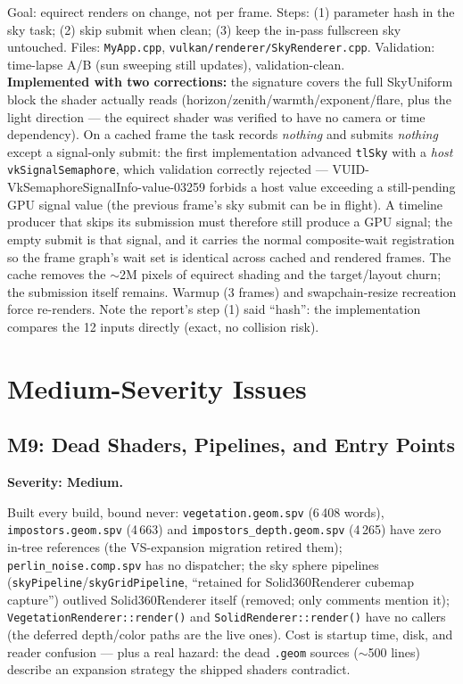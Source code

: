 \documentclass[11pt,a4paper]{article}
\begin{document}
\begin{tcolorbox}[promptbox={Prompt --- H8: cache the sky equirect}]
Goal: equirect renders on change, not per frame. Steps: (1) parameter hash
in the sky task; (2) skip submit when clean; (3) keep the in-pass
fullscreen sky untouched. Files: \texttt{MyApp.cpp},
\texttt{vulkan/renderer/SkyRenderer.cpp}. Validation: time-lapse A/B
(sun sweeping still updates), validation-clean.
\\ \textbf{Implemented with two corrections:} the signature covers the
full SkyUniform block the shader actually reads
(horizon/zenith/warmth/exponent/flare, plus the light direction --- the
equirect shader was verified to have no camera or time dependency). On a
cached frame the task records \emph{nothing} and submits \emph{nothing}
except a signal-only submit: the first implementation advanced
\texttt{tlSky} with a \emph{host} \texttt{vkSignalSemaphore}, which
validation correctly rejected --- VUID-VkSemaphoreSignalInfo-value-03259
forbids a host value exceeding a still-pending GPU signal value (the
previous frame's sky submit can be in flight). A timeline producer that
skips its submission must therefore still produce a GPU signal; the empty
submit is that signal, and it carries the normal composite-wait
registration so the frame graph's wait set is identical across cached and
rendered frames. The cache removes the $\sim$2M pixels of equirect shading
and the target/layout churn; the submission itself remains.
Warmup (3 frames) and swapchain-resize recreation force re-renders. Note
the report's step (1) said ``hash'': the implementation compares the 12
inputs directly (exact, no collision risk).
\end{tcolorbox}

\section{Medium-Severity Issues}

\subsection{M9: Dead Shaders, Pipelines, and Entry Points}
\label{sec:m9}

\textbf{Severity: Medium.}

Built every build, bound never: \texttt{vegetation.geom.spv} (6\,408 words),
\texttt{impostors.geom.spv} (4\,663) and
\texttt{impostors\_depth.geom.spv} (4\,265) have zero in-tree references
(the VS-expansion migration retired them); \texttt{perlin\_noise.comp.spv}
has no dispatcher; the sky sphere pipelines
(\texttt{skyPipeline}/\texttt{skyGridPipeline}, ``retained for
Solid360Renderer cubemap capture'') outlived Solid360Renderer itself
(removed; only comments mention it); \texttt{VegetationRenderer::render()}
and \texttt{SolidRenderer::render()} have no callers (the deferred
depth/color paths are the live ones). Cost is startup time, disk, and reader
confusion --- plus a real hazard: the dead \texttt{.geom} sources ($\sim$500
lines) describe an expansion strategy the shipped shaders contradict.
\end{document}
